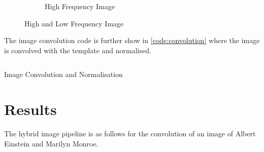 \documentclass[a4paper,12pt]{article}
\begin{document}
\begin{figure}[h!]
\begin{subfigure}{0.4\textwidth}
			\caption{High Frequency Image}
			\label{fig:high_freq}
		\end{subfigure}
		\caption{High and Low Frequency Image}
		\label{fig:uni_gauss}
	\end{figure}
	The image convolution code is further show in \ref{code:convolution} where the image is convolved with the template and normalised. 
	\begin{listing}[htbp!]
		\inputminted[breaklines=true,breakautoindent=true,firstline=85,lastline=107]{matlab}{minty_matlab.m}
		\caption{Image Convolution and Normalisation}
		\label{code:convolution} 
	\end{listing}
	 
\section{Results}
The hybrid image pipeline is as follows for the convolution of an image of Albert Einstein and Marilyn Monroe. 
\end{document}
